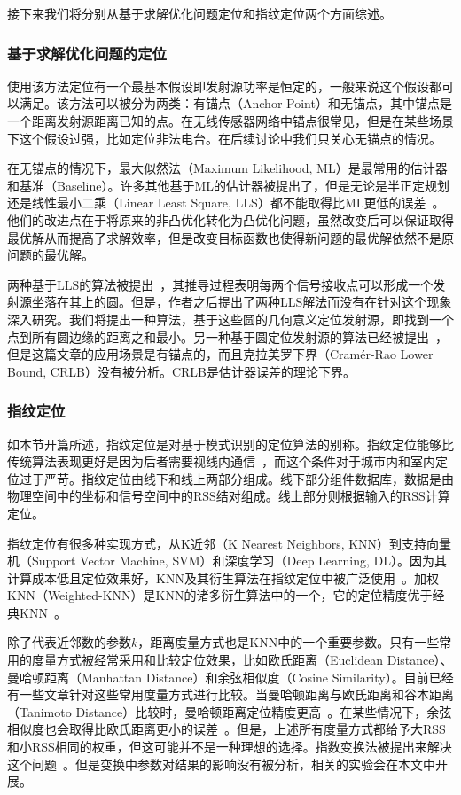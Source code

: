接下来我们将分别从基于求解优化问题定位和指纹定位两个方面综述。

\subsubsection{基于求解优化问题的定位}

使用该方法定位有一个最基本假设即发射源功率是恒定的，一般来说这个假设都可以满足。该方法可以被分为两类：有锚点（Anchor Point）和无锚点，其中锚点是一个距离发射源距离已知的点。在无线传感器网络中锚点很常见，但是在某些场景下这个假设过强，比如定位非法电台。在后续讨论中我们只关心无锚点的情况。

在无锚点的情况下，最大似然法（Maximum Likelihood, ML）是最常用的估计器和基准（Baseline）。许多其他基于ML的估计器被提出了，但是无论是半正定规划还是线性最小二乘（Linear Least Square, LLS）都不能取得比ML更低的误差~\cite{jackson2011received}。他们的改进点在于将原来的非凸优化转化为凸优化问题，虽然改变后可以保证取得最优解从而提高了求解效率，但是改变目标函数也使得新问题的最优解依然不是原问题的最优解。

两种基于LLS的算法被提出~\cite{wang2011near}，其推导过程表明每两个信号接收点可以形成一个发射源坐落在其上的圆。但是，作者之后提出了两种LLS解法而没有在针对这个现象深入研究。我们将提出一种算法，基于这些圆的几何意义定位发射源，即找到一个点到所有圆边缘的距离之和最小。另一种基于圆定位发射源的算法已经被提出~\cite{liu2006analysis}，但是这篇文章的应用场景是有锚点的，而且克拉美罗下界（Cram\'{e}r-Rao Lower Bound, CRLB）没有被分析。CRLB是估计器误差的理论下界。

\subsubsection{指纹定位}

如本节开篇所述，指纹定位是对基于模式识别的定位算法的别称。指纹定位能够比传统算法表现更好是因为后者需要视线内通信~\cite{gentile2012geolocation}，而这个条件对于城市内和室内定位过于严苛。指纹定位由线下和线上两部分组成。线下部分组件数据库，数据是由物理空间中的坐标和信号空间中的RSS结对组成。线上部分则根据输入的RSS计算定位。

指纹定位有很多种实现方式，从K近邻（K Nearest Neighbors, KNN）到支持向量机（Support Vector Machine, SVM）和深度学习（Deep Learning, DL）。因为其计算成本低且定位效果好，KNN及其衍生算法在指纹定位中被广泛使用~\cite{xia2017indoor}。加权KNN（Weighted-KNN）是KNN的诸多衍生算法中的一个，它的定位精度优于经典KNN~\cite{yen2017modified}。

除了代表近邻数的参数$k$，距离度量方式也是KNN中的一个重要参数。只有一些常用的度量方式被经常采用和比较定位效果，比如欧氏距离（Euclidean Distance）、曼哈顿距离（Manhattan Distance）和余弦相似度（Cosine Similarity）。目前已经有一些文章针对这些常用度量方式进行比较。当曼哈顿距离与欧氏距离和谷本距离（Tanimoto Distance）比较时，曼哈顿距离定位精度更高~\cite{marques2012combining}。在某些情况下，余弦相似度也会取得比欧氏距离更小的误差~\cite{han2015cosine}。但是，上述所有度量方式都给予大RSS和小RSS相同的权重，但这可能并不是一种理想的选择。指数变换法被提出来解决这个问题~\cite{torres2015comprehensive}。但是变换中参数对结果的影响没有被分析，相关的实验会在本文中开展。

